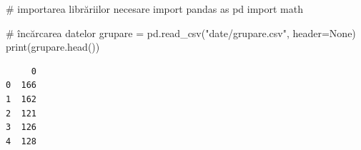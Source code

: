 \documentclass[
  11pt,
  b5paper,
  nottoc]{book}
\newenvironment{Shaded}{\begin{snugshade}}{\end{snugshade}}
\newcommand{\BuiltInTok}[1]{\textcolor[rgb]{0.00,0.23,0.31}{#1}}
\newcommand{\CommentTok}[1]{\textcolor[rgb]{0.37,0.37,0.37}{#1}}
\newcommand{\ImportTok}[1]{\textcolor[rgb]{0.00,0.46,0.62}{#1}}
\newcommand{\NormalTok}[1]{\textcolor[rgb]{0.00,0.23,0.31}{#1}}
\newcommand{\OperatorTok}[1]{\textcolor[rgb]{0.37,0.37,0.37}{#1}}
\newcommand{\StringTok}[1]{\textcolor[rgb]{0.13,0.47,0.30}{#1}}
\newcommand{\VariableTok}[1]{\textcolor[rgb]{0.07,0.07,0.07}{#1}}
\begin{document}
\begin{Shaded}
\begin{Highlighting}[]
\CommentTok{\# importarea librăriilor necesare}
\ImportTok{import}\NormalTok{ pandas }\ImportTok{as}\NormalTok{ pd}
\ImportTok{import}\NormalTok{ math}

\CommentTok{\# încărcarea datelor}
\NormalTok{grupare }\OperatorTok{=}\NormalTok{ pd.read\_csv(}\StringTok{"date/grupare.csv"}\NormalTok{, header}\OperatorTok{=}\VariableTok{None}\NormalTok{)}
\BuiltInTok{print}\NormalTok{(grupare.head())}
\end{Highlighting}
\end{Shaded}

\begin{verbatim}
     0
0  166
1  162
2  121
3  126
4  128
\end{verbatim}
\end{document}
